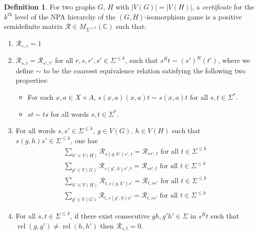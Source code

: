 \documentclass[a4paper,onecolumn,11pt,accepted=2026-01-06]{quantumarticle}
\theoremstyle{plain}
\theoremstyle{remark}
\theoremstyle{definition}
\newtheorem{definition}[thm]{Definition}
\DeclareMathOperator{\rel}{rel}
\newcommand{\card}[1]{\left\lvert #1 \right\rvert}
\renewcommand{\epsilon}{\varepsilon}
\begin{document}
\begin{definition}\label{def:cert-npa}
    For two graphs $G$, $H$ with $\card{V(G)} = \card{V(H)}$, a \emph{certificate} for the $k^{\text{th}}$ level of the NPA hierarchy of the $(G,H)$-isomorphism game is a positive semidefinite matrix $\mathcal{R} \in M_{\Sigma^{\leq k}}(\mathbb{C})$ such that: 
    \begin{enumerate}[label = (\roman*)]\label{eq:npa-for-graph-iso}
        \item \label{qiso-item-1}$\mathcal{R}_{\epsilon, \epsilon} = 1$
        \item \label{qiso-item-2} $\mathcal{R}_{s,t} = \mathcal{R}_{s',t'}$ for all $r,s,r',s' \in \Sigma^{\leq k}$, such that $s^Rt \sim (s')^R(t')$, where  we define $\sim$ to be the coarsest equivalence relation satisfying the following two properties:
\begin{itemize}
    \item For each $x,a \in X \times A$, $s(x,a)(x,a)t \sim s(x,a)t$ for all $s,t \in \Sigma^*$.
    \item $st \sim ts$ for all words $s,t \in \Sigma^*$.
\end{itemize} %
        \item \label{qiso-item-3} For all words $s,s' \in \Sigma^{\leq k}$, $g\in V(G)$, $h \in V(H)$ such that $s(g,h)s' \in \Sigma^{\leq k}$, one has 
        \begin{align}
            \sum_{h' \in V(H)} \mathcal{R}_{s(g,h')s', t} = \mathcal{R}_{ss', t} \text{ for all } t\in \Sigma^{\leq k}\label{eq:qiso31}\\
            \sum_{g' \in V(G)} \mathcal{R}_{s(g',h)s', t} = \mathcal{R}_{ss', t} \text{ for all } t\in \Sigma^{\leq k}\\
            \sum_{h' \in V(H)} \mathcal{R}_{t, s(g,h')s'} = \mathcal{R}_{t, ss'} \text{ for all } t\in \Sigma^{\leq k}\\
            \sum_{g' \in V(G)} \mathcal{R}_{t, s(g',h)s'} = \mathcal{R}_{t, ss'} \text{ for all } t\in \Sigma^{\leq k}
        \end{align}
        \item \label{qiso-item-4} For all $s, t \in\Sigma^{\leq k}$, if there exist consecutive $gh, g'h' \in \Sigma$ in $s^Rt$ such that $\rel(g,g') \neq \rel(h,h')$ then $\mathcal{R}_{s, t} = 0$. 
        \end{enumerate}
\end{definition}
\end{document}
